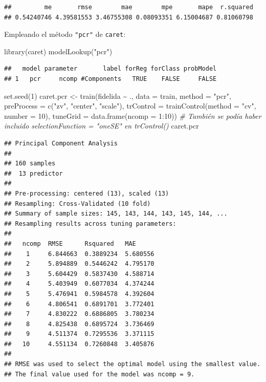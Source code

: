 \documentclass[
  spanish,
]{book}
\newenvironment{Shaded}{\begin{snugshade}}{\end{snugshade}}
\newcommand{\AttributeTok}[1]{\textcolor[rgb]{0.77,0.63,0.00}{#1}}
\newcommand{\CommentTok}[1]{\textcolor[rgb]{0.56,0.35,0.01}{\textit{#1}}}
\newcommand{\DecValTok}[1]{\textcolor[rgb]{0.00,0.00,0.81}{#1}}
\newcommand{\FunctionTok}[1]{\textcolor[rgb]{0.00,0.00,0.00}{#1}}
\newcommand{\NormalTok}[1]{#1}
\newcommand{\OtherTok}[1]{\textcolor[rgb]{0.56,0.35,0.01}{#1}}
\newcommand{\SpecialCharTok}[1]{\textcolor[rgb]{0.00,0.00,0.00}{#1}}
\newcommand{\StringTok}[1]{\textcolor[rgb]{0.31,0.60,0.02}{#1}}
\theoremstyle{break}
\theoremstyle{definition}
\theoremstyle{definition}
\theoremstyle{definition}
\theoremstyle{definition}
\theoremstyle{remark}
\begin{document}
\begin{verbatim}
##         me       rmse        mae        mpe       mape  r.squared 
## 0.54240746 4.39581553 3.46755308 0.08093351 6.15004687 0.81060798
\end{verbatim}

Empleando el método \texttt{"pcr"} de \texttt{caret}:

\begin{Shaded}
\begin{Highlighting}[]
\FunctionTok{library}\NormalTok{(caret)}
\FunctionTok{modelLookup}\NormalTok{(}\StringTok{"pcr"}\NormalTok{)}
\end{Highlighting}
\end{Shaded}

\begin{verbatim}
##   model parameter       label forReg forClass probModel
## 1   pcr     ncomp #Components   TRUE    FALSE     FALSE
\end{verbatim}

\begin{Shaded}
\begin{Highlighting}[]
\FunctionTok{set.seed}\NormalTok{(}\DecValTok{1}\NormalTok{)}
\NormalTok{caret.pcr }\OtherTok{\textless{}{-}} \FunctionTok{train}\NormalTok{(fidelida }\SpecialCharTok{\textasciitilde{}}\NormalTok{ ., }\AttributeTok{data =}\NormalTok{ train, }\AttributeTok{method =} \StringTok{"pcr"}\NormalTok{,}
                   \AttributeTok{preProcess =} \FunctionTok{c}\NormalTok{(}\StringTok{"zv"}\NormalTok{, }\StringTok{"center"}\NormalTok{, }\StringTok{"scale"}\NormalTok{),}
                   \AttributeTok{trControl =} \FunctionTok{trainControl}\NormalTok{(}\AttributeTok{method =} \StringTok{"cv"}\NormalTok{, }\AttributeTok{number =} \DecValTok{10}\NormalTok{),}
                   \AttributeTok{tuneGrid =} \FunctionTok{data.frame}\NormalTok{(}\AttributeTok{ncomp =} \DecValTok{1}\SpecialCharTok{:}\DecValTok{10}\NormalTok{))}
\CommentTok{\# También se podía haber incluido \textasciigrave{}selectionFunction = "oneSE"\textasciigrave{} en \textasciigrave{}trControl()\textasciigrave{}}
\NormalTok{caret.pcr}
\end{Highlighting}
\end{Shaded}

\begin{verbatim}
## Principal Component Analysis 
## 
## 160 samples
##  13 predictor
## 
## Pre-processing: centered (13), scaled (13) 
## Resampling: Cross-Validated (10 fold) 
## Summary of sample sizes: 145, 143, 144, 143, 145, 144, ... 
## Resampling results across tuning parameters:
## 
##   ncomp  RMSE      Rsquared   MAE     
##    1     6.844663  0.3889234  5.680556
##    2     5.894889  0.5446242  4.795170
##    3     5.604429  0.5837430  4.588714
##    4     5.403949  0.6077034  4.374244
##    5     5.476941  0.5984578  4.392604
##    6     4.806541  0.6891701  3.772401
##    7     4.830222  0.6886805  3.780234
##    8     4.825438  0.6895724  3.736469
##    9     4.511374  0.7295536  3.371115
##   10     4.551134  0.7260848  3.405876
## 
## RMSE was used to select the optimal model using the smallest value.
## The final value used for the model was ncomp = 9.
\end{verbatim}
\end{document}
